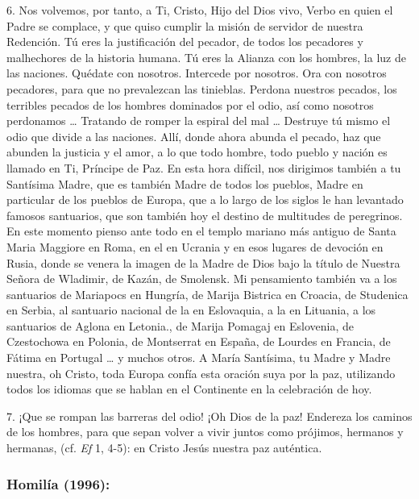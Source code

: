 \begin{body}
					6. Nos volvemos, por tanto, a Ti, Cristo, Hijo del Dios vivo, Verbo en quien el Padre se complace, y que quiso cumplir la misión de servidor de nuestra Redención. Tú eres la justificación del pecador, de todos los pecadores y malhechores de la historia humana. Tú eres la Alianza con los hombres, la luz de las naciones. Quédate con nosotros. Intercede por nosotros. Ora con nosotros pecadores, para que no prevalezcan las tinieblas. Perdona nuestros pecados, los terribles pecados de los hombres dominados por el odio, así como nosotros perdonamos \ldots{} Tratando de romper la espiral del mal \ldots{} Destruye tú mismo el odio que divide a las naciones. Allí, donde ahora abunda el pecado, haz que abunden la justicia y el amor, a lo que todo hombre, todo pueblo y nación es llamado en Ti, Príncipe de Paz. En esta hora difícil, nos dirigimos también a tu Santísima Madre, que es también Madre de todos los pueblos, Madre en particular de los pueblos de Europa, que a lo largo de los siglos le han levantado famosos santuarios, que son también hoy el destino de multitudes de peregrinos. En este momento pienso ante todo en el templo mariano más antiguo de Santa Maria Maggiore en Roma, en el  en Ucrania y en esos lugares de devoción en Rusia, donde se venera la imagen de la Madre de Dios bajo la título de Nuestra Señora de Wladimir, de Kazán, de Smolensk. Mi pensamiento también va a los santuarios de Mariapocs en Hungría, de Marija Bistrica en Croacia, de Studenica en Serbia, al santuario nacional de la  en Eslovaquia, a la  en Lituania, a los santuarios de Aglona en Letonia., de Marija Pomagaj en Eslovenia, de Czestochowa en Polonia, de Montserrat en España, de Lourdes en Francia, de Fátima en Portugal \ldots{} y muchos otros. A María Santísima, tu Madre y Madre nuestra, oh Cristo, toda Europa confía esta oración suya por la paz, utilizando todos los idiomas que se hablan en el Continente en la celebración de hoy.
					
					7. ¡Que se rompan las barreras del odio! ¡Oh Dios de la paz! Endereza los caminos de los hombres, para que sepan volver a vivir juntos como prójimos, hermanos y hermanas,  (cf. \emph{Ef} 1, 4-5): en Cristo Jesús nuestra paz auténtica.
				\end{body}
			
			\subsubsection{Homilía (1996):}
			
